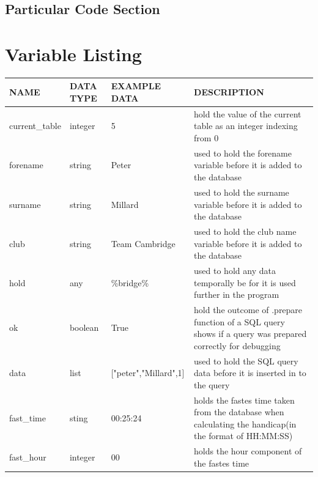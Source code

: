 \subsection{Particular Code Section}

\section{Variable Listing}


\begin{longtable}{|l|l|l|p{4cm}|}
	\hline
	NAME           & DATA TYPE & EXAMPLE DATA          & DESCRIPTION                                                                                                \\ \hline
	current\_table & integer   & 5                     & hold the value of the current table as an integer indexing from 0                                          \\ \hline
	forename       & string    & Peter                 & used to hold the forename variable before it is added to the database                                      \\ \hline
	surname        & string    & Millard               & used to hold the surname variable before it is added to the database                                       \\ \hline
	club           & string    & Team Cambridge        & used to hold the club name variable before it is added to the database                                     \\ \hline
	hold           & any       & \%bridge\%            & used to hold any data temporally be for it is used further in the program                                  \\ \hline
	ok             & boolean   & True                  & hold the outcome of .prepare function of a SQL query shows if a query was prepared correctly for debugging \\ \hline
	data           & list      & ["peter","Millard",1] & used to hold the SQL query data before it is inserted in to the query                                      \\ \hline
	fast\_time     & sting     & 00:25:24              & holds the fastes time taken from the database when calculating the handicap(in the format of HH:MM:SS)     \\ \hline
	fast\_hour     & integer   & 00                    & holds the hour component of the fastes time                                                                \\ \hline

\end{longtable}
